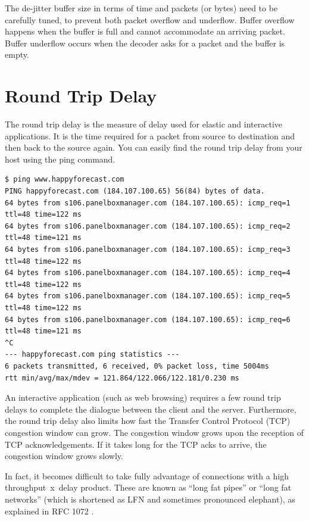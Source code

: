 The de-jitter buffer size in terms of time and packets (or bytes) need to be carefully tuned, to prevent both packet overflow and underflow.
Buffer overflow happens when the buffer is full and cannot accommodate an arriving packet.
Buffer underflow occurs when the decoder asks for a packet and the buffer is empty.

\section{Round Trip Delay}

The round trip delay is the measure of delay used for elastic and interactive applications.
It is the time required for a packet from source to destination and then back to the source again.
You can easily find the round trip delay from your host using the ping command.

\begin{lstlisting}
$ ping www.happyforecast.com
PING happyforecast.com (184.107.100.65) 56(84) bytes of data.
64 bytes from s106.panelboxmanager.com (184.107.100.65): icmp_req=1 ttl=48 time=122 ms
64 bytes from s106.panelboxmanager.com (184.107.100.65): icmp_req=2 ttl=48 time=121 ms
64 bytes from s106.panelboxmanager.com (184.107.100.65): icmp_req=3 ttl=48 time=122 ms
64 bytes from s106.panelboxmanager.com (184.107.100.65): icmp_req=4 ttl=48 time=122 ms
64 bytes from s106.panelboxmanager.com (184.107.100.65): icmp_req=5 ttl=48 time=122 ms
64 bytes from s106.panelboxmanager.com (184.107.100.65): icmp_req=6 ttl=48 time=121 ms
^C
--- happyforecast.com ping statistics ---
6 packets transmitted, 6 received, 0% packet loss, time 5004ms
rtt min/avg/max/mdev = 121.864/122.066/122.181/0.230 ms
\end{lstlisting}

An interactive application (such as web browsing) requires a few round trip delays to complete the dialogue between the client and the server.
Furthermore, the round trip delay also limits how fast the Transfer Control Protocol (TCP) congestion window can grow.
The congestion window grows upon the reception of TCP acknowledgements.
If it takes long for the TCP acks to arrive, the congestion window grows slowly.

In fact, it becomes difficult to take fully advantage of connections with a high \mbox{throughput x delay} product.
These are known as ``long fat pipes'' or ``long fat networks'' (which is shortened as LFN and sometimes pronounced elephant), as explained in RFC 1072 \cite{rfc1072}.

